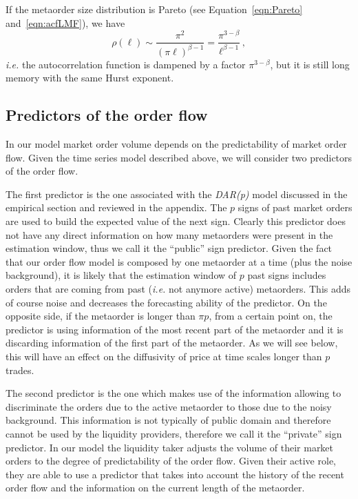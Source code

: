 \documentclass[12pt]{iopart}
\begin{document}
If the metaorder size distribution is Pareto (see Equation~\ref{eqn:Pareto} and~\ref{eqn:acfLMF}), we have
\begin{equation*}
 \rho(\ell)\sim \frac{\pi^2}{(\pi\ell)^{\beta-1}}=\frac{\pi^{3-\beta}}{\ell^{\beta-1}}\,,
\end{equation*}
\emph{i.e.} the autocorrelation function is dampened by a factor $\pi^{3-\beta}$, but it is still long memory with the same Hurst exponent.

\subsection{Predictors of the order flow}
In our model market order volume depends on the predictability of market order flow. Given the time series model described above, we will consider two predictors of the order flow. 

The first predictor is the one associated with the \textit{DAR(p)} model discussed in the empirical section and reviewed in the appendix. The $p$ signs of past market orders are used to build the expected value of the next sign. Clearly this predictor does not have any direct information on how many metaorders were present in the estimation window, thus we call it the “public” sign predictor. Given the fact that our order flow model is composed by one metaorder at a time (plus the noise background), it is likely that the estimation window of $p$ past signs includes orders that are coming from past (\emph{i.e.} not anymore active) metaorders. This adds of course noise and decreases the forecasting ability of the predictor. On the opposite side, if the metaorder is longer than $\pi p$, from a certain point on, the predictor is using information of the most recent part of the metaorder and it is discarding information of the first part of the metaorder. As we will see below, this will have an effect on the diffusivity of price at time scales longer than $p$ trades.

The second predictor is the one which makes use of the information allowing to discriminate the orders due to the active metaorder to those due to the noisy background. This information is not typically of public domain and therefore cannot be used by the liquidity providers, therefore we call it the “private” sign predictor. In our model the liquidity taker adjusts the volume of their market orders to the degree of predictability of the order flow. Given their active role, they are able to use a predictor that takes into account the history of the recent order flow and the information on the current length of the metaorder.
\end{document}
